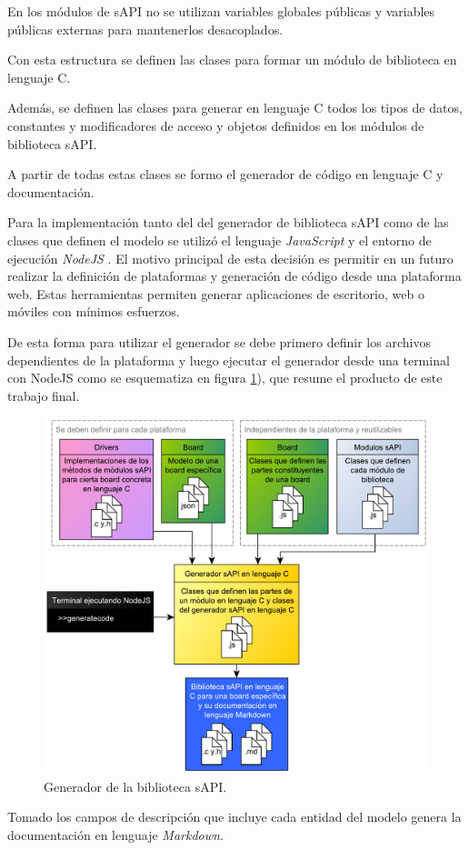 En los módulos de sAPI no se utilizan variables globales públicas y variables públicas externas para mantenerlos desacoplados.

Con esta estructura se definen las clases para formar un módulo de biblioteca en lenguaje C.

Además, se definen las clases para generar en lenguaje C todos los tipos de datos, constantes y modificadores de acceso y objetos definidos en los módulos de biblioteca sAPI.

A partir de todas estas clases se formo el generador de código en lenguaje C y documentación.

Para la implementación tanto del del generador de biblioteca sAPI como de las clases que definen el modelo se utilizó el lenguaje \emph{JavaScript} \citep{JavaScript} y el entorno de ejecución \emph{NodeJS} \citep{NodeJS}. El motivo principal de esta decisión es permitir en un futuro realizar la definición de plataformas y generación de código desde una plataforma web. Estas herramientas permiten generar aplicaciones de escritorio, web o móviles con mínimos esfuerzos.

De esta forma para utilizar el generador se debe primero definir los archivos dependientes de la plataforma y luego ejecutar el generador desde una terminal con NodeJS como se esquematiza en figura \ref{fig:fullSapiGen}), que resume el producto de este trabajo final.

\begin{figure}[!htbp]
\begin{center}  %
\includegraphics*[width=14.5cm]{Figures/sapi_gen2.pdf}
\par\caption{Generador de la biblioteca sAPI.}\label{fig:fullSapiGen}
\end{center}
\end{figure}

Tomado los campos de descripción que incluye cada entidad del modelo genera la documentación en lenguaje \emph{Markdown}. 
